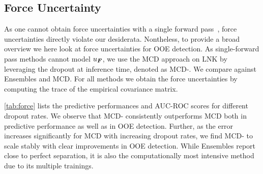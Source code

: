 \subsection{Force Uncertainty}
As one cannot obtain force uncertainties with a single forward pass~\citep{gasteigerFastUncertaintyAwareDirectional2020}, force uncertainties directly violate our \desseven{} desiderata.
Nontheless, to provide a broad overview we here look at force uncertainties for OOE detection.
As single-forward pass methods cannot model $u_{\bm{F}}$, we use the MCD approach on LNK by leveraging the dropout at inference time, denoted as MCD-\oursacro{}. We compare against Ensembles and MCD. For all methods we obtain the force uncertainties by computing the trace of the empirical covariance matrix.

\autoref{tab:force} lists the predictive performances and AUC-ROC scores for different dropout rates.
We observe that MCD-\oursacro{} consistently outperforms MCD both in predictive performance as well as in OOE detection.
Further, as the error increases significantly for MCD with increasing dropout rates, we find MCD-\oursacro{} to scale stably with clear improvements in OOE detection.
While Ensembles report close to perfect separation, it is also the computationally most intensive method due to its multiple trainings.

\begin{table}[htb]
    \centering
    \caption{Comparison of Ensembles, MCD, and \oursacro{} on QM7X with DimeNet++ as backbone for different dropout rates.}
    \vspace{0.05in}
    \resizebox{\columnwidth}{!}{
    
    }
    \label{tab:force}
\end{table}